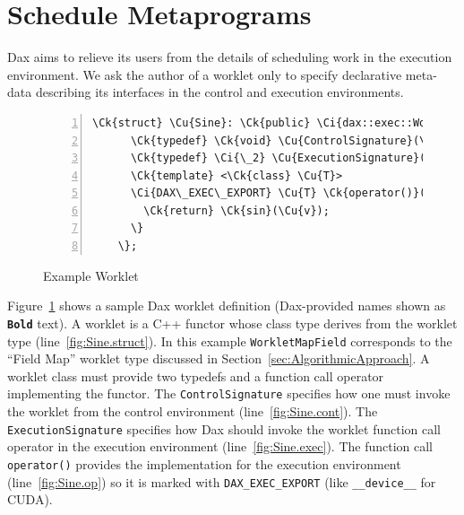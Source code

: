 \documentclass[conference]{IEEEtran}
\newcommand{\Ck}[1]{{#1}} %
\newcommand{\Ci}[1]{{\textbf{#1}}} %
\newcommand{\CiDesc}{\Ci{Bold}}
\newcommand{\Cu}[1]{{\color{gray}\textbf{#1}}} %
\newcommand{\Code}[1]{{\small\texttt{#1}}}
\begin{document}
\section{Schedule Metaprograms}
\label{sec:ScheduleMetaprograms}

\noindent
%
Dax aims to relieve its users from the details of scheduling work in
the execution environment.
%
We ask the author of a worklet only to specify declarative meta-data
describing its interfaces in the control and execution environments.

\begin{figure}[ht]\centering
  \begin{Verbatim}[commandchars=\\\{\}, gobble=4, frame=single,
                   fontfamily=tt, fontsize=\scriptsize,
                   numbers=left, numbersep=2pt]
    \Ck{struct} \Cu{Sine}: \Ck{public} \Ci{dax::exec::WorkletMapField} \{ \label{fig:Sine.struct}
      \Ck{typedef} \Ck{void} \Cu{ControlSignature}(\Ci{Field}(\Ci{In}), \Ci{Field}(\Ci{Out})); \label{fig:Sine.cont}
      \Ck{typedef} \Ci{\_2} \Cu{ExecutionSignature}(\Ci{\_1}); \label{fig:Sine.exec}
      \Ck{template} <\Ck{class} \Cu{T}>
      \Ci{DAX\_EXEC\_EXPORT} \Cu{T} \Ck{operator()}(\Cu{T} \Cu{v}) \Ck{const} \{ \label{fig:Sine.op}
        \Ck{return} \Ck{sin}(\Cu{v});
      \}
    \};
  \end{Verbatim}
  \caption{Example Worklet}\label{fig:Sine}
\end{figure}

Figure~\ref{fig:Sine} shows a sample Dax worklet definition
(Dax-provided names shown as \Code{\CiDesc} text).
%
A worklet is a C++ functor whose class type derives from the worklet
type (line~\ref{fig:Sine.struct}).
%
In this example \Code{WorkletMapField} corresponds to the ``Field
Map'' worklet type discussed in Section~\ref{sec:AlgorithmicApproach}.
%
A worklet class must provide two typedefs and a function call operator
implementing the functor.
%
The \Code{ControlSignature} specifies how one must invoke the
worklet from the control environment (line~\ref{fig:Sine.cont}).
%
The \Code{ExecutionSignature} specifies how Dax should invoke the
worklet function call operator in the execution environment
(line~\ref{fig:Sine.exec}).
%
The function call \Code{operator()} provides the implementation for
the execution environment (line~\ref{fig:Sine.op}) so it is marked
with \Code{DAX\_EXEC\_EXPORT} (like \Code{\_\_device\_\_} for
CUDA).
\end{document}
